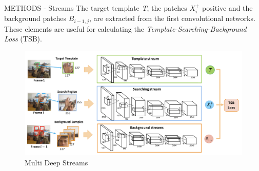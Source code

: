 \begin{frame}{METHODS - Streams}
    The target template \emph{T}, the patches $X_i^+$ positive and the background patches $B_{i-1,j}$, are extracted from the first convolutional networks. These elements are useful for calculating the \emph{Template-Searching-Background Loss} (TSB).
    \begin{figure}[h!]
        \centering
        \includegraphics[width = \linewidth]{images/paper8/streams.png}
        \centering
        \caption{Multi Deep Streams}
        \label{fig:streams}
    \end{figure}
\end{frame}

